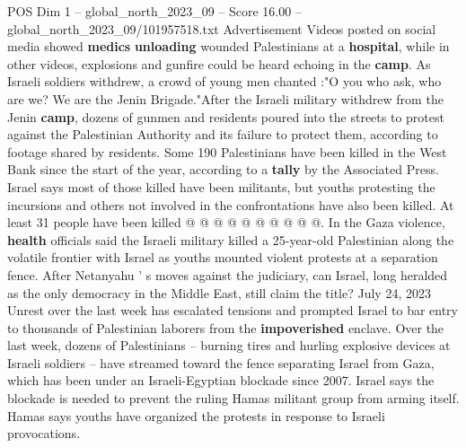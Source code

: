 \begin{textsample}{POS Dim 1 – global\_north\_2023\_09 – Score 16.00 – global\_north\_2023\_09/101957518.txt}
Advertisement Videos posted on social media showed \textbf{medics} \textbf{unloading} wounded Palestinians at a \textbf{hospital}, while in other videos, explosions and gunfire could be heard echoing in the \textbf{camp}.
As Israeli soldiers withdrew, a crowd of young men chanted :"O you who ask, who are we?
We are the Jenin Brigade."After the Israeli military withdrew from the Jenin \textbf{camp}, dozens of gunmen and residents poured into the streets to protest against the Palestinian Authority and its failure to protect them, according to footage shared by residents.
Some 190 Palestinians have been killed in the West Bank since the start of the year, according to a \textbf{tally} by the Associated Press.
Israel says most of those killed have been militants, but youths protesting the incursions and others not involved in the confrontations have also been killed.
At least 31 people have been killed @ @ @ @ @ @ @ @ @ @.
In the Gaza violence, \textbf{health} officials said the Israeli military killed a 25-year-old Palestinian along the volatile frontier with Israel as youths mounted violent protests at a separation fence.
After Netanyahu ' s moves against the judiciary, can Israel, long heralded as the only democracy in the Middle East, still claim the title?
July 24, 2023 Unrest over the last week has escalated tensions and prompted Israel to bar entry to thousands of Palestinian laborers from the \textbf{impoverished} enclave.
Over the last week, dozens of Palestinians -- burning tires and hurling explosive devices at Israeli soldiers -- have streamed toward the fence separating Israel from Gaza, which has been under an Israeli-Egyptian blockade since 2007.
Israel says the blockade is needed to prevent the ruling Hamas militant group from arming itself.
Hamas says youths have organized the protests in response to Israeli provocations.

\end{textsample}
